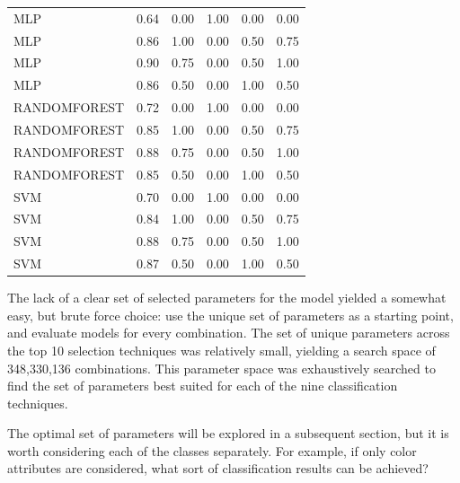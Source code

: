 \documentclass[letterpaper]{report}
\begin{document}
\begin{small}
{\begin{longtable}{lrrrrr}
         MLP & 0.64 &      0.00 & 1.00 &       0.00 &       0.00 \\
         MLP & 0.86 &      1.00 & 0.00 &       0.50 &       0.75 \\
         MLP & 0.90 &      0.75 & 0.00 &       0.50 &       1.00 \\
         MLP & 0.86 &      0.50 & 0.00 &       1.00 &       0.50 \\
RANDOMFOREST & 0.72 &      0.00 & 1.00 &       0.00 &       0.00 \\
RANDOMFOREST & 0.85 &      1.00 & 0.00 &       0.50 &       0.75 \\
RANDOMFOREST & 0.88 &      0.75 & 0.00 &       0.50 &       1.00 \\
RANDOMFOREST & 0.85 &      0.50 & 0.00 &       1.00 &       0.50 \\
         SVM & 0.70 &      0.00 & 1.00 &       0.00 &       0.00 \\
         SVM & 0.84 &      1.00 & 0.00 &       0.50 &       0.75 \\
         SVM & 0.88 &      0.75 & 0.00 &       0.50 &       1.00 \\
         SVM & 0.87 &      0.50 & 0.00 &       1.00 &       0.50 \\
\end{longtable}




}
\end{small}

The lack of a clear set of selected parameters for the model yielded a somewhat easy, but brute force choice: use the unique set of parameters as a starting point, and evaluate models for every combination. The set of unique parameters across the top 10 selection techniques was relatively small, yielding a search space of 348,330,136 combinations. This parameter space was exhaustively searched to find the set of parameters best suited for each of the  nine classification techniques.

The optimal set of parameters will be explored in a subsequent section, but it is worth considering each of the classes separately. For example, if only color attributes are considered, what sort of classification results can be achieved?
\end{document}
